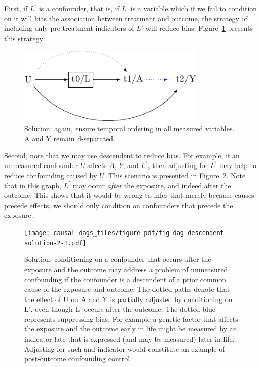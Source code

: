 \documentclass[
  singlecolumn]{report}
\begin{document}
First, if \(L^\prime\) is a confounder, that is, if \(L^\prime\) is a
variable which if we fail to condition on it will bias the association
between treatment and outcome, the strategy of including only
pre-treatment indicators of \(L\prime\) will reduce bias.
Figure~\ref{fig-dag-descendent-solution} presents this strategy

\begin{figure}

{\centering \includegraphics[width=0.8\textwidth,height=\textheight]{causal-dags_files/figure-pdf/fig-dag-descendent-solution-1.pdf}

}

\caption{\label{fig-dag-descendent-solution}Solution: again, ensure
temporal ordering in all measured variables. A and Y remain
d-separated.}

\end{figure}

Second, note that we may use descendent to reduce bias. For example, if
an unmeasured confounder \(U\) affects \(A\), \(Y\), and \(L^\prime\),
then adjusting for \(L^\prime\) may help to reduce confounding caused by
\(U\). This scenario is presented in
Figure~\ref{fig-dag-descendent-solution-2}. Note that in this graph,
\(L^\prime\) may occur \emph{after} the exposure, and indeed after the
outcome. This shows that it would be wrong to infer that merely because
causes precede effects, we should only condition on confounders that
precede the exposure.

\begin{figure}

{\centering \texttt{[image: causal-dags\_files/figure-pdf/fig-dag-descendent-solution-2-1.pdf]}

}

\caption{\label{fig-dag-descendent-solution-2}Solution: conditioning on
a confounder that occurs after the exposure and the outcome may address
a problem of unmeasured confounding if the confounder is a descendent of
a prior common cause of the exposure and outcome. The dotted paths
denote that the effect of U on A and Y is partially adjusted by
conditioning on L', even though L' occurs after the outcome. The dotted
blue represents suppressing bias. For example a genetic factor that
affects the exposure and the outcome early in life might be measured by
an indicator late that is expressed (and may be measured) later in life.
Adjusting for such and indicator would constitute an example of
post-outcome confounding control.}

\end{figure}
\end{document}
